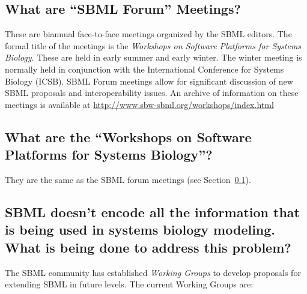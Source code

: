 \documentclass{sbmlfaq}
\begin{document}
\subsection{What are ``SBML Forum'' Meetings?}
\label{sec:forums}

These are biannual face-to-face meetings organized by the SBML editors.
The formal title of the meetings is the \emph{Workshops on Software
  Platforms for Systems Biology}.  These are held in early summer and early
winter.  The winter meeting is normally held in conjunction with the
International Conference for Systems Biology (ICSB).  SBML Forum meetings
allow for significant discussion of new SBML proposals and interoperability
issues.  An archive of information on these meetings is available at
\url{http://www.sbw-sbml.org/workshops/index.html}

\subsection{What are the ``Workshops on Software Platforms for Systems Biology''?}

They are the same as the SBML forum meetings (see Section~\ref{sec:forums}).


\subsection{SBML doesn't encode all the information that is
  being used in systems biology modeling.  What is being done to address
  this problem?}
\label{sec:workinggroups}

The SBML community has established \emph{Working Groups} to develop
proposals for extending SBML in future levels.  The current Working Groups
are:
\end{document}
